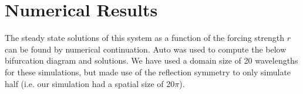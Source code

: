 \documentclass[../main/WavelengthCompetition.tex]{subfiles}
\begin{document}
\section{Numerical Results}
The steady state solutions of this system as a function of the forcing strength $r$ can be found by numerical continuation.  Auto was used to compute the below bifurcation diagram and solutions.  We have used a domain size of 20 wavelengths for these simulations, but made use of the reflection symmetry to only simulate half (i.e. our simulation had a spatial size of 20$\pi$).  
\end{document}
